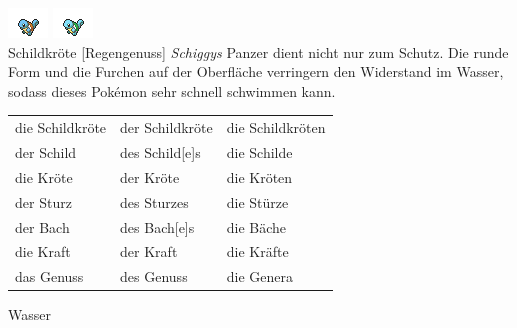 \documentclass[a7paper,10pt,%
,toc
,print
]{kartei}
\begin{document}
\begin{karte}[Sturzbach]{
\includegraphics{../regular/squirtle}
\includegraphics{../shiny/squirtle} \\
Schildkröte
}[Regengenuss]
\emph{Schiggys} Panzer dient nicht nur zum Schutz. Die runde Form und die
Furchen auf der Oberfläche verringern den Widerstand im Wasser, sodass dieses 
Pokémon sehr schnell schwimmen kann.

\vspace{5pt}
\begin{tabular}{lll}
die Schildkröte	&	der Schildkröte	&	die Schildkröten \\
der Schild	&	des Schild[e]s	&	die Schilde \\
die Kröte	&	der Kröte	&	die Kröten \\
der Sturz	&	des Sturzes	&	die Stürze \\
der Bach	&	des Bach[e]s	&	die Bäche \\
die Kraft	&	der Kraft	&	die Kräfte \\
das Genuss	&	des Genuss	&	die Genera \\
\end{tabular}
\vspace{5pt}

Wasser
\end{karte}
\end{document}
